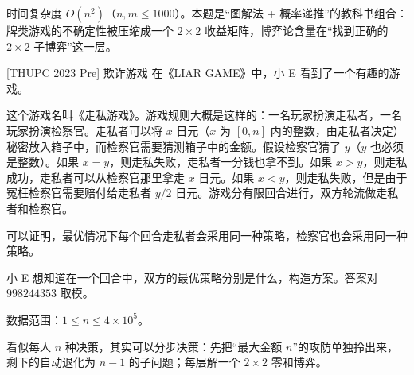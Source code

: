 \cost 时间复杂度 $O(n^{2})$（$n,m\le1000$）。本题是“图解法 + 概率递推”的教科书组合：牌类游戏的不确定性被压缩成一个 $2\times2$ 收益矩阵，博弈论含量在“找到正确的 $2\times2$ 子博弈”这一层。


\begin{problem}{[THUPC 2023 Pre] 欺诈游戏}
在《LIAR GAME》中，小 E 看到了一个有趣的游戏。

这个游戏名叫《走私游戏》。游戏规则大概是这样的：一名玩家扮演走私者，一名玩家扮演检察官。走私者可以将 $x$ 日元（$x$ 为 $[0,n]$ 内的整数，由走私者决定）秘密放入箱子中，而检察官需要猜测箱子中的金额。假设检察官猜了 $y$（$y$ 也必须是整数）。如果 $x=y$，则走私失败，走私者一分钱也拿不到。如果 $x>y$，则走私成功，走私者可以从检察官那里拿走 $x$ 日元。如果 $x<y$，则走私失败，但是由于冤枉检察官需要赔付给走私者 $y/2$ 日元。游戏分有限回合进行，双方轮流做走私者和检察官。

可以证明，最优情况下每个回合走私者会采用同一种策略，检察官也会采用同一种策略。

小 E 想知道在一个回合中，双方的最优策略分别是什么，构造方案。答案对 $998244353$ 取模。

数据范围：$1\le n\le4\times10^{5}$。
\end{problem}

\hint 看似每人 $n$ 种决策，其实可以分步决策：先把“最大金额 $n$”的攻防单独拎出来，剩下的自动退化为 $n-1$ 的子问题；每层解一个 $2\times2$ 零和博弈。

